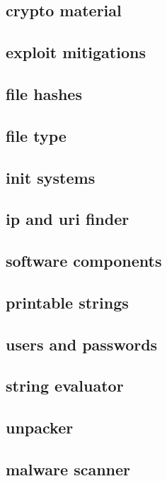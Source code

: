 \documentclass{article}
\begin{document}
\subsection*{crypto material}
{\selectfont

}

\subsection*{exploit mitigations}
{\selectfont

}

\subsection*{file hashes}
{\selectfont

}

\subsection*{file type}
{\selectfont

}

\subsection*{init systems}
{\selectfont

}

\subsection*{ip and uri finder}
{\selectfont

}

\subsection*{software components}
{\selectfont

}

\subsection*{printable strings}
{\selectfont

}

\subsection*{users and passwords}
{\selectfont

}

\subsection*{string evaluator}
{\selectfont

}

\subsection*{unpacker}
{\selectfont

}

\subsection*{malware scanner}
{\selectfont

}
\end{document}
